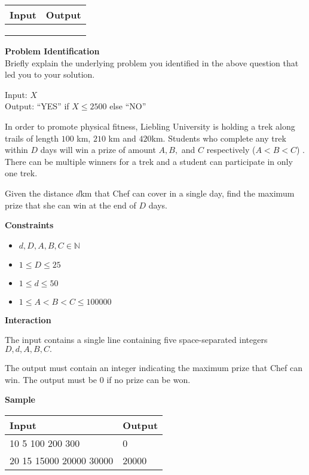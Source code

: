 \documentclass[a4paper]{exam}
\newcommand\heading[1]{\textbf{#1}}
\newcommand\inn{\in \mathbb{N}}
\begin{document}
\begin{questions}
    \begin{tabularx}{\textwidth}{|X|X|}
        \rowcolor{gray!50}
        \hline
        Input & Output \\ \hline\hline
              &        \\\hline
              &        \\\hline
              &        \\\hline
    \end{tabularx}

    \heading{Problem Identification}\\
    Briefly explain the underlying problem you identified in the above question that led you to your solution.

  \begin{mdframed}
    Input: $X$\\
    Output: ``YES'' if $X\leq 2500$ else ``NO''
  \end{mdframed}


    In order to promote physical fitness, Liebling University is holding a trek along trails of length $100$ km, $210$ km and $420$km. Students who complete any trek within $D$ days will win a prize of amount $A,B,$ and $C$ respectively ($A<B<C$) . There can be multiple winners for a trek and a student can participate in only one trek.

    Given the distance $d$km that Chef can cover in a single day, find the maximum prize that she can win at the end of $D$ days.

    \heading{Constraints}
    \begin{itemize}
        \item $d,D,A,B,C \inn$
        \item $1 \le D \le 25$
        \item $1 \le d \le 50$
        \item $1 \le A < B < C \le 100000$
    \end{itemize}


    \heading{Interaction}

    The input contains a single line containing five space-separated integers $D,d,A,B,C.$

    The output must contain an integer indicating the maximum prize that Chef can win. The output must be $0$ if no prize can be won.

    \heading{Sample}

    \begin{tabularx}{\textwidth}{|X|X|}
        \rowcolor{gray!50}
        \hline
        Input      & Output \\ \hline\hline
        10 5 100 200 300  & 0      \\\hline
        20 15 15000 20000 30000 & 20000      \\\hline
    \end{tabularx}


\end{questions}
\end{document}
